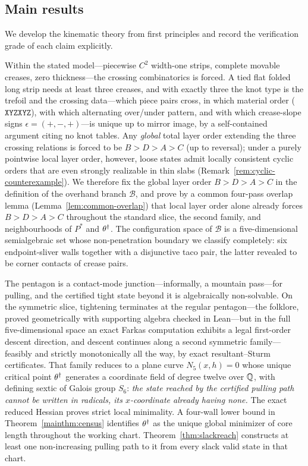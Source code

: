 \subsection{Main results}
We develop the kinematic theory from first principles and record the verification grade of each claim explicitly.

Within the stated model---piecewise $C^2$ width-one strips, complete movable creases, zero thickness---the crossing combinatorics is forced. A tied flat folded long strip needs at least three creases, and with exactly three the knot type is the trefoil and the crossing data---which piece pairs cross, in which material order ($\mathtt{XYZXYZ}$), with which alternating over/under pattern, and with which crease-slope signs $\epsilon=(+,-,+)$---is unique up to mirror image, by a self-contained argument citing no knot tables. Any \emph{global} total layer order extending the three crossing relations is forced to be $B>D>A>C$ (up to reversal); under a purely pointwise local layer order, however, loose states admit locally consistent cyclic orders that are even strongly realizable in thin slabs (Remark~\ref{rem:cyclic-counterexample}). We therefore fix the global layer order $B>D>A>C$ in the definition of the overhand branch $\mathcal B$, and prove by a common four-pass overlap lemma (Lemma~\ref{lem:common-overlap}) that local layer order alone already forces $B>D>A>C$ throughout the standard slice, the second family, and neighbourhoods of $P^*$ and $\theta^\dagger$. The configuration space of $\mathcal B$ is a five-dimensional semialgebraic set whose non-penetration boundary we classify completely: six endpoint-sliver walls together with a disjunctive taco pair, the latter revealed to be corner contacts of crease pairs.

The pentagon is a contact-mode junction---informally, a mountain pass---for pulling, and the certified tight state beyond it is algebraically non-solvable. On the symmetric slice, tightening terminates at the regular pentagon---the folklore, proved geometrically with supporting algebra checked in Lean---but in the full five-dimensional space an exact Farkas computation exhibits a legal first-order descent direction, and descent continues along a second symmetric family---feasibly and strictly monotonically all the way, by exact resultant--Sturm certificates. That family reduces to a plane curve $N_5(x,h)=0$ whose unique critical point $\theta^\dagger$ generates a coordinate field of degree twelve over $\mathbb{Q}$, with defining sextic of Galois group $S_6$: \emph{the state reached by the certified pulling path cannot be written in radicals, its $x$-coordinate already having none.} The exact reduced Hessian proves strict local minimality. A four-wall lower bound in Theorem~\ref{mainthm:census} identifies $\theta^\dagger$ as the unique global minimizer of core length throughout the working chart. Theorem~\ref{thm:slackreach} constructs at least one non-increasing pulling path to it from every slack valid state in that chart.

